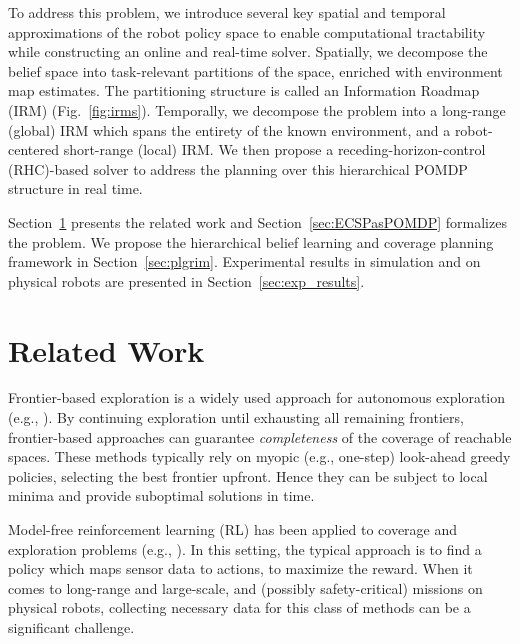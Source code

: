 \documentclass[letterpaper]{article} %
\newcommand{\ph}[1]{{\textbf{#1}:}} %
\begin{document}
To address this problem, we introduce several key spatial and temporal approximations of the robot policy space to enable computational tractability while constructing an online and real-time solver.
Spatially, we decompose the belief space into task-relevant partitions of the space,
enriched with environment map estimates. %
The partitioning structure is called an Information Roadmap (IRM) (Fig.~\ref{fig:irms}). Temporally, we decompose the problem into a long-range (global) IRM which spans the entirety of the known environment, and a robot-centered short-range (local) IRM. %
We then propose a receding-horizon-control (RHC)-based solver to address the planning over this hierarchical POMDP structure %
in real time.

Section~\ref{sec:related_work} presents the related work and Section~\ref{sec:ECSPasPOMDP} formalizes the problem.
We propose the hierarchical belief learning and coverage planning framework in Section~\ref{sec:plgrim}. Experimental results in simulation and on physical robots are presented in Section~\ref{sec:exp_results}.%


\section{Related Work}\label{sec:related_work}
Frontier-based exploration is a widely used approach for autonomous exploration (e.g., \cite{yamauchi1997frontier,tao2007motion,keidar2012robot,heng2015efficient,gonzalez2002navigation,grabowski2003autonomous}). By continuing exploration until exhausting all remaining frontiers, frontier-based approaches can guarantee \textit{completeness} of the coverage of reachable spaces.  These methods typically rely on myopic (e.g., one-step) look-ahead greedy policies, selecting the best frontier upfront. Hence they can be subject to local minima and provide suboptimal solutions in time.

Model-free reinforcement learning (RL) has been applied to coverage and exploration problems (e.g., \cite{pathak_icm, rnd,burda2018study,ECR2018}). In this setting, the typical approach is to find a policy which maps sensor data to actions, to maximize the reward. When it comes to long-range and large-scale, and (possibly safety-critical) missions on physical robots, collecting necessary data for this class of methods can be a significant challenge.
\end{document}
